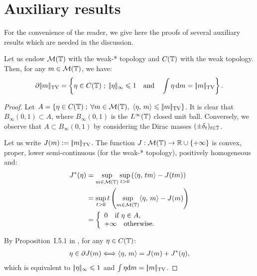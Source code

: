 
\appendix
\section{Auxiliary results}
\label{sec-auxiliary}

For the convenience of the reader, we give here the proofs of several auxiliary results
 which are needed in the discussion.
 

\begin{prop}
Let us endow $\mathcal{M}(\mathbb{T})$ with the weak-* topology and $C(\mathbb{T})$ with the weak topology.
Then, for any $m\in \mathcal{M}(\mathbb{T})$, we have:
\begin{align*}
 	\partial |\!| m |\!|_{\text{\upshape TV}} = \left\{ \eta\in C(\mathbb{T}) \;;\;  |\!| \eta |\!|_{\infty} \leqslant 1 \quad \text{and} \quad \int \eta \, \mathrm{d} m =|\!| m |\!|_{\text{\upshape TV}}   \right\}.
\end{align*}
\label{prop-subdifferential}
\end{prop}

\begin{proof}
Let $A=\left\{  \eta \in C(\mathbb{T})  \;;\;  \forall m\in \mathcal{M}(\mathbb{T}), \ \langle \eta,\,m\rangle \leqslant |\!| m |\!|_{\text{\upshape TV}}  \right\}$.
It is clear that $B_\infty(0,1)\subset A$, where $B_\infty(0,1)$ is the $L^\infty(\mathbb{T})$ closed unit ball.
Conversely, we observe that $A\subset B_\infty(0,1)$ by considering the Dirac masses $(\pm \delta_t)_{t\in \mathbb{T}}$.

Let us write $J(m):= |\!| m |\!|_{\text{\upshape TV}}$. The function $J:\mathcal{M}(\mathbb{T})\rightarrow \mathbb{R}\cup \{+\infty\}$ is convex, proper, lower semi-continuous (for the weak-* topology), positively homogeneous and:
\begin{align*}
J^*(\eta)&=\sup_{m\in \mathcal{M}(\mathbb{T})} \sup_{t>0} \left( \langle \eta,\,t m\rangle -J(t m) \right)\\
&=\sup_{t>0} t\left( \sup_{m\in \mathcal{M}(\mathbb{T})} \langle \eta,\,m\rangle -J(m) \right)\\
&=\left\{ \begin{array}{l} 
		 0 \quad \mbox{if } \eta\in A,  \\
		 +\infty \quad \mbox{otherwise.} \\
	 \end{array} \right.
\end{align*}

By Proposition~I.5.1 in \cite{ekeland1976convex}, for any $\eta\in C(\mathbb{T})$:
\begin{align*}
\eta\in \partial J(m) \Longleftrightarrow  \langle \eta,\,m\rangle = J(m) +J^*(\eta),
\end{align*}
which is equivalent to $|\!| \eta |\!|_{\infty}\leqslant 1$ and $\int \eta \mathrm{d} m = |\!| m |\!|_{\text{\upshape TV}}$.
\end{proof}

